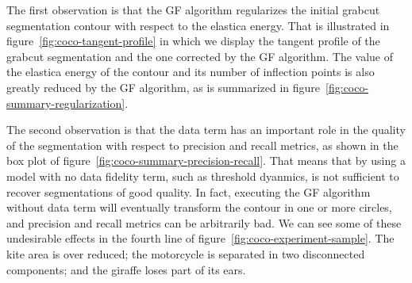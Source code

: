 \documentclass[smallextended]{svjour3}
\begin{document}
%
%
%
The first observation is that the GF algorithm regularizes the initial grabcut segmentation contour with respect to the elastica energy. That is illustrated in figure~\ref{fig:coco-tangent-profile} in which we display the tangent profile of the grabcut segmentation and the one corrected by the GF algorithm. The value of the elastica energy of the contour and its number of inflection points is also greatly reduced by the GF algorithm, as is summarized in figure~\ref{fig:coco-summary-regularization}.

The second observation is that the data term has an important role in the quality of the segmentation with respect to precision and recall metrics, as shown in the box plot of figure~\ref{fig:coco-summary-precision-recall}. That means that by using a model with no data fidelity term, such as threshold dyanmics, is not sufficient to recover segmentations of good quality. In fact, executing the GF algorithm without data term will eventually transform the contour in one or more circles, and precision and recall metrics can be arbitrarily bad. We can see some of these undesirable effects in the fourth line of figure~\ref{fig:coco-experiment-sample}. The kite area is over reduced; the motorcycle is separated in two disconnected components; and the giraffe loses part of its ears.
\end{document}
